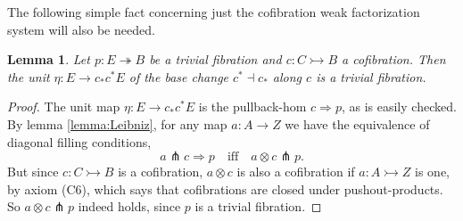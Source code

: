 \documentclass[12pt]{article}
\newcommand{\mono}{\ensuremath{\rightarrowtail}}
\newcommand{\ra}{\ensuremath{\rightarrow}}
\renewcommand{\to}{\ensuremath{\rightarrow}}
\newcommand{\onto}{\ensuremath{\twoheadrightarrow}}
\newtheorem{lemma}[theorem]{Lemma}
\theoremstyle{remark}
\theoremstyle{definition}
\begin{document}
The following simple fact concerning just the cofibration weak factorization system will also be needed.

\begin{lemma}\label{lemma:etaTF}
Let $p: E \onto B$ be a trivial fibration and $c : C\mono B$ a cofibration.  Then the unit $\eta:E \ra c_*c^*E$ of the base change $c^*\dashv c_*$ along $c$ is a trivial fibration.
\end{lemma}

\begin{proof}
The unit map $\eta:E \ra c_*c^*E$ is the pullback-hom $c\!\Rightarrow\! p$, as is easily checked.
By lemma \ref{lemma:Leibniz}, for any map $a : A \to Z$ we have the equivalence of diagonal filling conditions,
\[
a \pitchfork c\!\Rightarrow\!p  \quad\text{iff}\quad a\!\otimes\!c \pitchfork p.
\]
But since $c : C\mono B$ is a cofibration, $a\otimes c$ is also a cofibration if $a : A \mono Z$ is one, by axiom (C6), which says that cofibrations are closed under pushout-products.  So $a\otimes c \pitchfork p$ indeed holds, since $p$ is a trivial fibration.
\end{proof}
\end{document}
